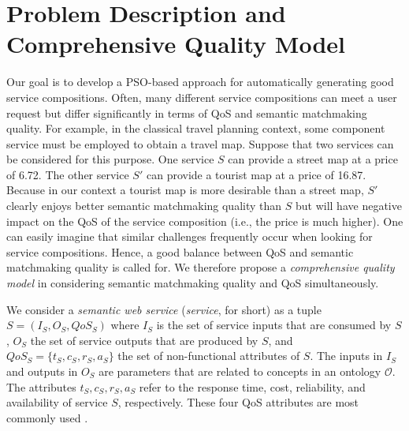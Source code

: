 \documentclass{llncs}
\begin{document}
\section{Problem Description and Comprehensive Quality Model}\label{Motivation and Problem Description}\label{Motivation}\label{problemDes}\label{qualityModel}\label{Comprehensive_Quality_Model}\label{qualityModel}

Our goal is to develop a PSO-based approach for automatically generating good service compositions. Often, many different service compositions can meet a user request but differ significantly in terms of QoS and semantic matchmaking quality. For example, in the classical travel planning context, some component service must be employed to obtain a travel map. Suppose that two services can be considered for this purpose. One service $S$ can provide a street map at a price of 6.72. The other service $S'$ can provide a tourist map at a price of 16.87. Because in our context a tourist map is more desirable than a street map, $S'$ clearly enjoys better semantic matchmaking quality than $S$ but will have negative impact on the QoS of the service composition (i.e., the price is much higher). One can easily imagine that similar challenges frequently occur when looking for service compositions. Hence, a good balance between QoS and semantic matchmaking quality is called for. We therefore propose a \emph{comprehensive quality model} in considering semantic matchmaking quality and QoS simultaneously.

We consider a \emph{semantic web service} (\emph{service}, for short) as a tuple $S = (I_{S}, O_{S}, QoS_S)$ where $I_{S}$ is the set of service inputs that are consumed by $S$, $O_{S}$ the set of service outputs that are produced by $S$, and $QoS_{S}=\{t_S, c_S, r_S, a_S\}$ the set of non-functional attributes of $S$. The inputs in $I_{S}$ and outputs in $O_{S}$ are parameters that are related to concepts in an ontology $\mathcal{O}$. The attributes $t_S, c_S, r_S, a_S$ refer to the response time, cost, reliability, and availability of service $S$, respectively. These four QoS attributes are most commonly used \cite{zeng2003quality}.
\end{document}
